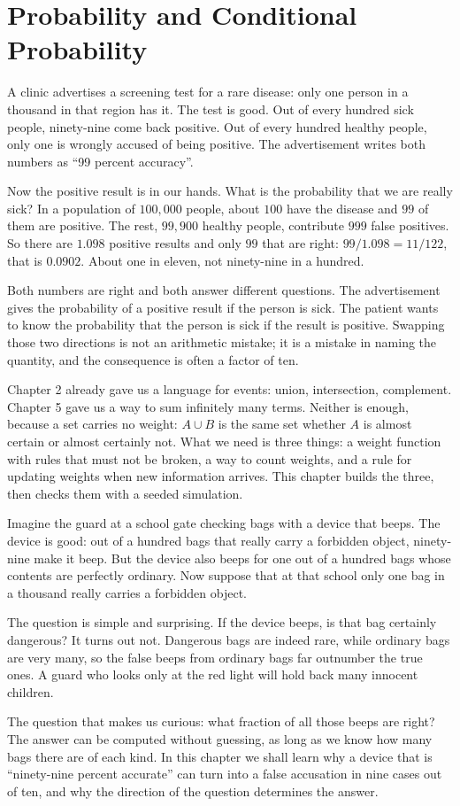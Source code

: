 \chapter{Probability and Conditional Probability}

A clinic advertises a screening test for a rare disease: only one person in a thousand in
that region has it. The test is good. Out of every hundred sick people, ninety-nine come
back positive. Out of every hundred healthy people, only one is wrongly accused of being
positive. The advertisement writes both numbers as ``99 percent accuracy''.

Now the positive result is in our hands. What is the probability that we are really sick?
In a population of $100{,}000$ people, about $100$ have the disease and $99$ of them are
positive. The rest, $99{,}900$ healthy people, contribute $999$ false positives. So there
are $1.098$ positive results and only $99$ that are right: $99/1.098=11/122$,
that is $0.0902$. About one in eleven, not ninety-nine in a hundred.

Both numbers are right and both answer different questions. The advertisement gives the
probability of a positive result if the person is sick. The patient wants to know the
probability that the person is sick if the result is positive. Swapping those two
directions is not an arithmetic mistake; it is a mistake in naming the quantity, and the
consequence is often a factor of ten.

Chapter 2 already gave us a language for events: union, intersection, complement. Chapter 5
gave us a way to sum infinitely many terms. Neither is enough, because a set carries no
weight: $A\cup B$ is the same set whether $A$ is almost certain or almost certainly not.
What we need is three things: a weight function with rules that must not be broken, a way
to count weights, and a rule for updating weights when new information arrives. This
chapter builds the three, then checks them with a seeded simulation.

\begin{untukanak}
Imagine the guard at a school gate checking bags with a device that beeps. The device is
good: out of a hundred bags that really carry a forbidden object, ninety-nine make it
beep. But the device also beeps for one out of a hundred bags whose contents are perfectly
ordinary. Now suppose that at that school only one bag in a thousand really carries a
forbidden object.

The question is simple and surprising. If the device beeps, is that bag certainly
dangerous? It turns out not. Dangerous bags are indeed rare, while ordinary bags are very
many, so the false beeps from ordinary bags far outnumber the true ones. A guard who looks
only at the red light will hold back many innocent children.

The question that makes us curious: what fraction of all those beeps are right? The answer
can be computed without guessing, as long as we know how many bags there are of each kind.
In this chapter we shall learn why a device that is ``ninety-nine percent accurate'' can
turn into a false accusation in nine cases out of ten, and why the direction of the
question determines the answer.
\end{untukanak}

